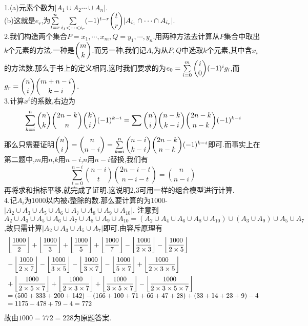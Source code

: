 \documentclass[b5paper]{ctexart}
\newcommand{\floor}[1]{\left\lfloor #1\right\rfloor}
\begin{document}
\pagestyle{plain}
\noindent
\\
1.(a)元素个数为$|A_1\cup A_2\cdots\cup A_n|$.\\
(b)这就是$e_r$,为$\sum\limits_{t=r}^n\sum\limits_{i_1<\cdots<i_r}(-1)^{t-r}\dbinom{t}{r}|A_{i_1}\cap\cdots\cap A_{i_r}|.$\\
2.我们构造两个集合$P={x_1,\cdots,x_m},Q={y_1,\cdots,y_n}$.用两种方法去计算从$P$集合中取出$k$个元素的方法.一种是$\dbinom{m}{k}$.而另一种,我们记$A_i$为从$P,Q$中选取$k$个元素,其中含$x_i$的方法数.那么于书上的定义相同,这时我们要求的为$e_0=\sum\limits_{i=0}^m\dbinom{i}{0}(-1)^ig_i$,而$g_r=\dbinom{n}{i}\dbinom{m+n-i}{k-i}$.\\
3.计算$x^i$的系数,右边为\[\sum\limits_{k=i}^n\dbinom{n}{k}\dbinom{2n-k}{n}\dbinom{k}{i}(-1)^{k-i}=\sum\limits\dbinom{n}{i}\dbinom{n-k}{k-i}\dbinom{2n-k}{n-k}(-1)^{k-i}\]
那么只需要证明$\dbinom{n}{i}=\dbinom{n}{n-i}=\sum\limits_{k=i}^n\dbinom{n-i}{k-i}\dbinom{2n-k}{n-k}(-1)^{k-i}$即可.而事实上在第二题中,$m$用$n$,$k$用$n-i$,$n$用$n-i$替换,我们有
\[\sum_{t=0}^{n-i}\binom{n-i}{t}\binom{2n-i-t}{n-i-t}=\binom{n}{n-i}\]
再将求和指标平移,就完成了证明.这说明2,3可用一样的组合模型进行计算.\\
4.记$A_i$为$1000$以内被$i$整除的数.那么要计算的为1000-$|A_2\cup A_3\cup A_5\cup A_6\cup A_7\cup A_8\cup A_9\cup A_{10}|$.
注意到$A_2\cup A_3\cup A_5\cup A_6\cup A_7\cup A_8\cup A_9\cup A_10=(A_2\cup A_4\cup A_6\cup A_8\cup A_{10})\cup (A_3\cup A_9)\cup A_5\cup A_7$,故只需计算$|A_2\cup A_3\cup A_5\cup A_7|$即可.由容斥原理有
\[\begin{array}{l}
\floor{\dfrac{1000}{2}}+\floor{\dfrac{1000}{3}}+\floor{\dfrac{1000}{5}}+\floor{\dfrac{1000}{7}}-\floor{\dfrac{1000}{2\times 3}}-\floor{\dfrac{1000}{2\times 5}}\vspace{5pt}\\-\floor{\dfrac{1000}{2\times 7}}
-\floor{\dfrac{1000}{3\times 5}}-\floor{\dfrac{1000}{3 \times 7}}-\floor{\dfrac{1000}{5\times 7}}+\floor{\dfrac{1000}{2\times 3\times 5}}\vspace{5pt}\\+\floor{\dfrac{1000}{2\times 5\times 7}}+\floor{\dfrac{1000}{2\times 3\times 7}}
+\floor{\dfrac{1000}{3\times 5\times 7}}-\floor{\dfrac{1000}{2\times 3\times 5\times 7}}
\\=
(500+333+200+142)-(166+100+71+66+47+28)+(33+14+23+9)-4\\
=
1175-478+79-4=772
\end{array}\]
故由$1000=772=228$为原题答案.
\\
\\
\end{document}

